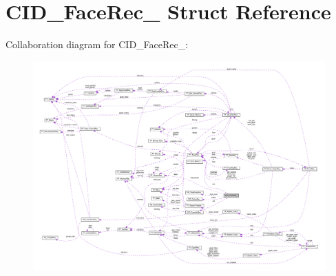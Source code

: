 \hypertarget{structCID__FaceRec__}{}\section{C\+I\+D\+\_\+\+Face\+Rec\+\_\+ Struct Reference}
\label{structCID__FaceRec__}


Collaboration diagram for C\+I\+D\+\_\+\+Face\+Rec\+\_\+\+:
\nopagebreak
\begin{figure}[H]
\begin{center}
\leavevmode
\includegraphics[width=350pt]{structCID__FaceRec____coll__graph}
\end{center}
\end{figure}
